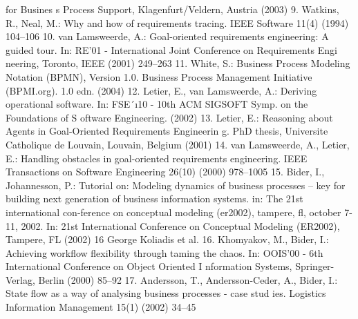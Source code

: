 for Busines s Process Support, Klagenfurt/Veldern, Austria (2003)
9. Watkins, R., Neal, M.: Why and how of requirements tracing. IEEE Software
11(4) (1994) 104–106
10. van Lamsweerde, A.: Goal-oriented requirements engineering: A guided tour. In:
RE’01 - International Joint Conference on Requirements Engi neering, Toronto,
IEEE (2001) 249–263
11. White, S.: Business Process Modeling Notation (BPMN), Version 1.0. Business
Process Management Initiative (BPMI.org). 1.0 edn. (2004)
12. Letier, E., van Lamsweerde, A.: Deriving operational software. In: FSE´ı10 - 10th
ACM SIGSOFT Symp. on the Foundations of S oftware Engineering. (2002)
13. Letier, E.: Reasoning about Agents in Goal-Oriented Requirements Engineerin g.
PhD thesis, Universite Catholique de Louvain, Louvain, Belgium (2001)
14. van Lamsweerde, A., Letier, E.: Handling obstacles in goal-oriented requirements
engineering. IEEE Transactions on Software Engineering 26(10) (2000) 978–1005
15. Bider, I., Johannesson, P.: Tutorial on: Modeling dynamics of business processes
– key for building next generation of business information systems. in: The 21st
international con-ference on conceptual modeling (er2002), tampere, fl, october
7-11, 2002. In: 21st International Conference on Conceptual Modeling (ER2002),
Tampere, FL (2002)
16 George Koliadis et al.
16. Khomyakov, M., Bider, I.: Achieving workflow flexibility through taming the chaos.
In: OOIS’00 - 6th International Conference on Object Oriented I nformation Systems, Springer-Verlag, Berlin (2000) 85–92
17. Andersson, T., Andersson-Ceder, A., Bider, I.: State flow as a way of analysing
business processes - case stud ies. Logistics Information Management 15(1) (2002)
34–45